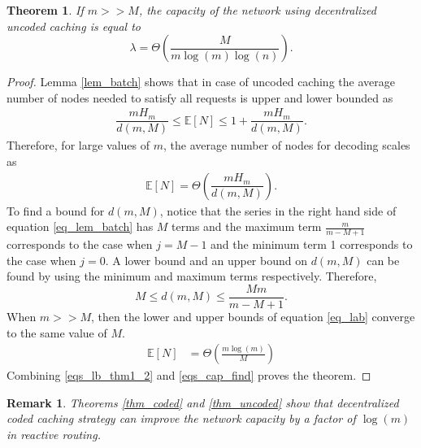 \documentclass[10pt,journal]{IEEEtran}
\newtheorem{thm}{Theorem}
\newtheorem{rem}{Remark}
\begin{document}
\begin{thm}{\em 
 If $m>>M$, the capacity of the network using decentralized uncoded caching is equal to  
  \begin{equation}
  \lambda = \Theta \left(\frac{M}{m \log(m) \log(n)} \right).
  \label{ex_uncoded}
 \end{equation}
  \label{thm_uncoded}
}\end{thm}
\begin{proof}
 Lemma \ref{lem_batch} shows that in case of uncoded caching the average number of nodes needed to satisfy all requests 
 is upper and lower bounded as 
 \begin{align}
\dfrac{m H_m}{d(m,M)} \le \mathbb{E}[N] \le 1+\dfrac{m H_m}{d(m,M)}.  
 \end{align}
 Therefore, for large values of $m$, the average number of nodes  for decoding scales as 
 \begin{align}
 \mathbb{E}[N] =  \Theta \left(\dfrac{m H_m}{d(m,M)} \right).
 \label{eqs_thm_1_2}
 \end{align}
 To find a bound for $d(m,M)$, notice that the series in the right hand side of equation \eqref{eq_lem_batch} has $M$ terms and the maximum term $\frac{m}{m-M+1}$ corresponds to the case when $j=M-1$ and the minimum term 1 corresponds to the case when $j=0$. A lower bound and an upper bound on $d(m,M)$ can be found by using the minimum and maximum terms respectively. Therefore,
 \begin{equation}
  M \le d(m,M) \le \frac{M m}{m-M+1}.
  \label{eq_lab}
 \end{equation}
 When $m>>M$, then the lower and upper bounds of equation \eqref{eq_lab} converge to the same value of $M$.
  \begin{align}
  \mathbb{E}[N] &= \Theta \left(\frac{m \log(m) }{M } \right) 
  \label{eqs_lb_thm1_2}
  \end{align}
 Combining  \eqref{eqs_lb_thm1_2} and \eqref{eqs_cap_find} proves the theorem. 
 \end{proof}
\begin{rem}{\em
Theorems \ref{thm_coded} and \ref{thm_uncoded} show that  decentralized coded caching strategy can improve the network capacity by a factor of $\log(m)$ in reactive routing.  
}\label{rem_cap_improve}
\end{rem}
\end{document}

